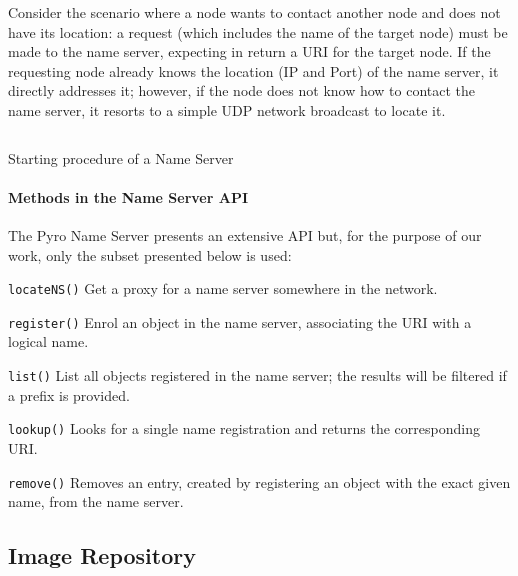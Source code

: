 Consider the scenario where a node wants to contact another node and does not have its location: a request (which includes the name of the target node) must be made to the name server, expecting in return a URI for the target node. If the requesting node already knows the location (IP and Port) of the name server, it directly addresses it; however, if the node does not know how to contact the name server, it resorts to a simple UDP network broadcast to locate it.

\begin{listing}[ht]
\inputminted{python}{./Chapters/Code/cap4_NameServer.py}
\caption{Starting procedure of a Name Server}
\label{listing:impl_icbd_nameserver}
\end{listing}

\paragraph{Methods in the Name Server API}

The Pyro Name Server presents an extensive API but, for the purpose of our work, only the subset presented below is used:

\begin{description}
	\item \texttt{locateNS()} Get a proxy for a name server somewhere in the network.
	\item \texttt{register()} Enrol an object in the name server, associating the URI with a logical name.
	\item \texttt{list()} List all objects registered in the name server; the results will be filtered if a prefix is provided.
	\item \texttt{lookup()} Looks for a single name registration and returns the corresponding URI.
	\item \texttt{remove()} Removes an entry, created by registering an object with the exact given name, from the name server.
\end{description}




\subsection{Image Repository}
\label{sub:impl_icbdrep_image_repo}

